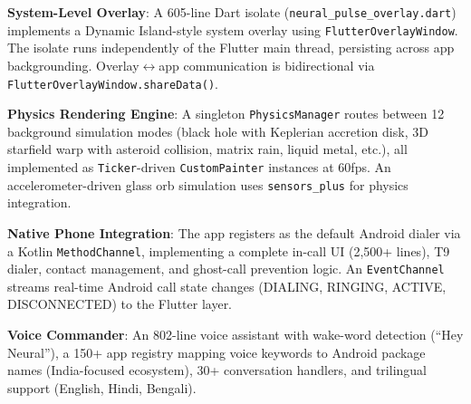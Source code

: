 \documentclass[conference]{IEEEtran}
\begin{document}
\textbf{System-Level Overlay}: A 605-line Dart isolate (\texttt{neural\_pulse\_overlay.dart}) implements a Dynamic Island-style system overlay using \texttt{FlutterOverlayWindow}. The isolate runs independently of the Flutter main thread, persisting across app backgrounding. Overlay$\leftrightarrow$app communication is bidirectional via \texttt{FlutterOverlayWindow.shareData()}.

\textbf{Physics Rendering Engine}: A singleton \texttt{PhysicsManager} routes between 12 background simulation modes (black hole with Keplerian accretion disk, 3D starfield warp with asteroid collision, matrix rain, liquid metal, etc.), all implemented as \texttt{Ticker}-driven \texttt{CustomPainter} instances at 60fps. An accelerometer-driven glass orb simulation uses \texttt{sensors\_plus} for physics integration.

\textbf{Native Phone Integration}: The app registers as the default Android dialer via a Kotlin \texttt{MethodChannel}, implementing a complete in-call UI (2,500+ lines), T9 dialer, contact management, and ghost-call prevention logic. An \texttt{EventChannel} streams real-time Android call state changes (DIALING, RINGING, ACTIVE, DISCONNECTED) to the Flutter layer.

\textbf{Voice Commander}: An 802-line voice assistant with wake-word detection (``Hey Neural''), a 150+ app registry mapping voice keywords to Android package names (India-focused ecosystem), 30+ conversation handlers, and trilingual support (English, Hindi, Bengali).
\end{document}
